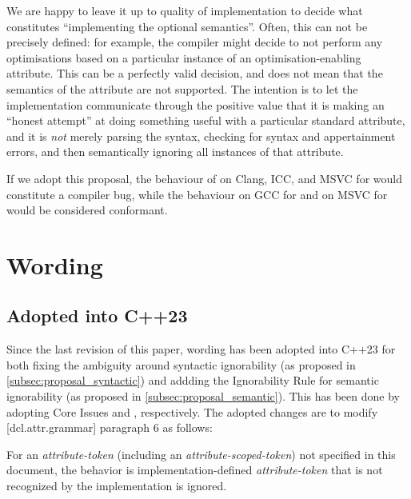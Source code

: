 We are happy to leave it up to quality of implementation to decide what constitutes ``implementing the optional semantics''. Often, this can not be precisely defined: for example, the compiler might decide to not perform any optimisations based on a particular instance of an optimisation-enabling attribute. This can be a perfectly valid decision, and does not mean that the semantics of the attribute are not supported. The intention is to let the implementation communicate through the positive value that it is making an ``honest attempt'' at doing something useful with a particular standard attribute, and it is \emph{not} merely parsing the syntax, checking for syntax and appertainment errors, and then semantically ignoring all instances of that attribute.

If we adopt this proposal, the behaviour of  on Clang, ICC, and MSVC for  would constitute a compiler bug, while the behaviour on GCC for \mbox{} and on MSVC for  would be considered conformant.

\section{Wording}
\label{sec:wording}

\subsection{Adopted into C++23}

Since the last revision of this paper, wording has been adopted into C++23 for both fixing the ambiguity around syntactic ignorability (as proposed in \ref{subsec:proposal_syntactic}) and addding the Ignorability Rule for semantic ignorability (as proposed in \ref{subsec:proposal_semantic}). This has been done by adopting Core Issues \cite{CWG2538} and \cite{CWG2695}, respectively. The adopted changes are to modify [dcl.attr.grammar] paragraph 6 as follows:

\begin{adjustwidth}{0.5cm}{0.5cm}
For an \emph{attribute-token} (including an \emph{attribute-scoped-token})  not specified in this document, the behavior is implementation-defined \emph{attribute-token} that is not recognized by the implementation is ignored.


\end{adjustwidth}


